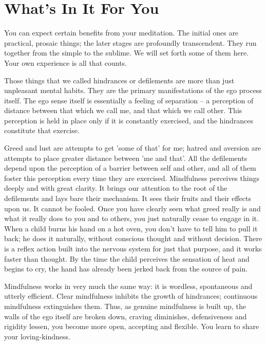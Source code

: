 \section{ What's In It For You} You can expect certain benefits from your
meditation. The initial ones are practical, prosaic things; the later stages are
profoundly transcendent. They run together from the simple to the sublime. We will set
forth some of them here. Your own experience is all that counts.

Those things that we called hindrances or defilements are more than just
unpleasant mental habits. They are the primary manifestations of the ego process
itself. The ego sense itself is essentially a feeling of separation -- a
perception of distance between that which we call me, and that which we call
other. This perception is held in place only if it is constantly exercised, and
the hindrances constitute that exercise.

Greed and lust are attempts to get 'some of that' for me; hatred and aversion
are attempts to place greater distance between 'me and that'. All the
defilements depend upon the perception of a barrier between self and other, and
all of them foster this perception every time they are exercised. Mindfulness
perceives things deeply and with great clarity. It brings our attention to the
root of the defilements and lays bare their mechanism. It sees their fruits and
their effects upon us. It cannot be fooled. Once you have clearly seen what
greed really is and what it really does to you and to others, you just naturally
cease to engage in it. When a child burns his hand on a hot oven, you don't have
to tell him to pull it back; he does it naturally, without conscious thought and
without decision. There is a reflex action built into the nervous system for
just that purpose, and it works faster than thought. By the time the child
perceives the sensation of heat and begins to cry, the hand has already been
jerked back from the source of pain.

Mindfulness works in very much the same way: it is wordless, spontaneous and
utterly efficient. Clear mindfulness inhibits the growth of hindrances;
continuous mindfulness extinguishes them. Thus, as genuine mindfulness is built
up, the walls of the ego itself are broken down, craving diminishes,
defensiveness and rigidity lessen, you become more open, accepting and flexible.
You learn to share your loving-kindness.

